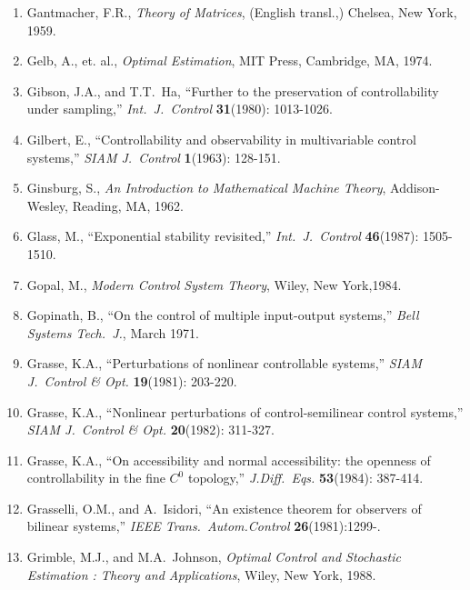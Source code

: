 \begin{enumerate}
\item
Gantmacher, F.R., {\it Theory of Matrices}, (English transl.,) Chelsea, New
York, 1959.

\item
Gelb, A., et. al., {\it Optimal Estimation}, MIT Press, Cambridge, MA, 1974.

\item
Gibson, J.A., and T.T.\ Ha, ``Further to the preservation of controllability
under sampling,'' {\it Int.\ J.\ Control} {\bf 31}(1980): 1013-1026.

\item
Gilbert, E., ``Controllability and observability in multivariable control
systems,'' {\it SIAM J.\ Control} {\bf 1}(1963): 128-151.

\item
Ginsburg, S., {\it An Introduction to Mathematical Machine Theory},
Addison-Wesley, Reading, MA, 1962.

\item
Glass, M., ``Exponential stability revisited,'' {\it Int.\ J.\ Control} {\bf
46}(1987): 1505-1510.

\item
Gopal, M., {\it Modern Control System Theory}, Wiley, New York,1984.

\item
Gopinath, B., ``On the control of multiple input-output systems,'' {\it Bell
Systems Tech.\ J.}, March 1971.

\item
Grasse, K.A., ``Perturbations of nonlinear controllable systems,'' {\it SIAM
J.\ Control \& Opt.} {\bf 19}(1981): 203-220.

\item
Grasse, K.A., ``Nonlinear perturbations of control-semilinear control
systems,'' {\it SIAM J.\ Control \& Opt.} {\bf 20}(1982): 311-327.

\item
Grasse, K.A., ``On accessibility and normal accessibility: the openness of
controllability in the fine $C^0$ topology,'' {\it J.Diff.\ Eqs.} {\bf
53}(1984): 387-414.

\item
Grasselli, O.M., and A.\ Isidori, ``An existence theorem for observers of
bilinear systems,'' {\it IEEE Trans.\ Autom.Control} {\bf
26}(1981):1299-.

\item
Grimble, M.J., and M.A.\ Johnson, {\it Optimal Control and Stochastic
Estimation : Theory and Applications}, Wiley, New York, 1988.


\end{enumerate}
